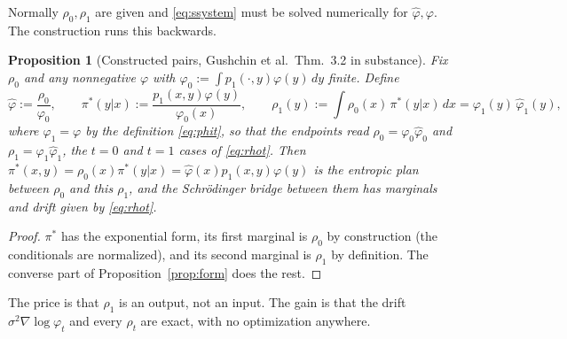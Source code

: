 \documentclass[11pt]{article}
\newcommand{\hphi}{\hat\varphi}
\theoremstyle{definition}
\theoremstyle{plain}
\newtheorem{proposition}[definition]{Proposition}
\begin{document}
Normally $\rho_0,\rho_1$ are given and \eqref{eq:ssystem} must be solved numerically for
$\hphi,\varphi$. The construction runs this backwards.

\begin{proposition}[Constructed pairs, Gushchin et al.\ Thm.\ 3.2 in substance]
\label{prop:construct}
Fix $\rho_0$ and any nonnegative $\varphi$ with $\varphi_0:=\int p_1(\cdot,y)\varphi(y)\,dy$
finite. Define
\begin{equation}
  \label{eq:construct}
  \hphi:=\frac{\rho_0}{\varphi_0},\qquad
  \pi^*(y|x):=\frac{p_1(x,y)\varphi(y)}{\varphi_0(x)},\qquad
  \rho_1(y):=\int\rho_0(x)\,\pi^*(y|x)\,dx=\varphi_1(y)\,\hphi_1(y),
\end{equation}
where $\varphi_1=\varphi$ by the definition \eqref{eq:phit}, so that the endpoints read
$\rho_0=\varphi_0\hphi_0$ and $\rho_1=\varphi_1\hphi_1$, the $t=0$ and $t=1$ cases of \eqref{eq:rhot}.
Then $\pi^*(x,y)=\rho_0(x)\pi^*(y|x)=\hphi(x)p_1(x,y)\varphi(y)$ is the entropic plan between
$\rho_0$ and this $\rho_1$, and the Schr\"odinger bridge between them has marginals and
drift given by \eqref{eq:rhot}.
\end{proposition}
\begin{proof}
$\pi^*$ has the exponential form, its first marginal is $\rho_0$ by construction (the
conditionals are normalized), and its second marginal is $\rho_1$ by definition. The
converse part of Proposition~\ref{prop:form} does the rest.
\end{proof}
The price is that $\rho_1$ is an output, not an input. The gain is that the drift
$\sigma^2\nabla\log\varphi_t$ and every $\rho_t$ are exact, with no optimization anywhere.
\end{document}
